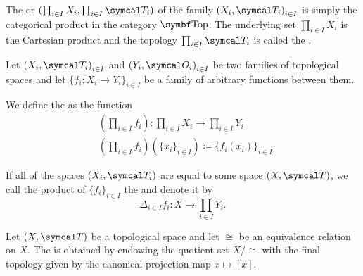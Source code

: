 \begin{definition}\label{def:topological_product}
  The  or  \( (\prod_{i \in I} X_i, \prod_{i \in I} \Cal{T}_i) \) of the family \( { (X_i, \Cal{T}_i) }_{i \in I} \) is simply the categorical product in the category \( \Cat{Top} \). The underlying set \( \prod_{i \in I} X_i \) is the Cartesian product and the topology \( \prod_{i \in I} \Cal{T}_i \) is called the .

  Let \( { (X_i, \Cal{T}_i) }_{i \in I} \) and \( { (Y_i, \Cal{O}_i) }_{i \in I} \) be two families of topological spaces and let \( \{ f_i: X_i \to Y_i \}_{i \in I} \) be a family of arbitrary functions between them.

  We define the  as the function
  \begin{align*}
    &\left(\prod_{i \in I} f_i \right): \prod_{i \in I} X_i \to \prod_{i \in I} Y_i \\
    &\left(\prod_{i \in I} f_i \right)(\{ x_i \}_{i \in I}) \coloneqq \{ f_i (x_i) \}_{i \in I}.
  \end{align*}

  If all of the spaces \( (X_i, \Cal{T}_i) \) are equal to some space \( (X, \Cal{T}) \), we call the product of \( \{ f_i \}_{i \in I} \) the  and denote it by
  \begin{equation*}
    \Delta_{i \in I} f_i: X \to \prod_{i \in I} Y_i.
  \end{equation*}
\end{definition}

\begin{definition}\label{def:topological_quotient}\cite[90]{Engelking1989}
  Let \( (X, \Cal{T}) \) be a topological space and let \( \cong \) be an equivalence relation on \( X \). The  is obtained by endowing the quotient set \( X / \cong \) with the final topology given by the canonical projection map \( x \mapsto [x] \).
\end{definition}

